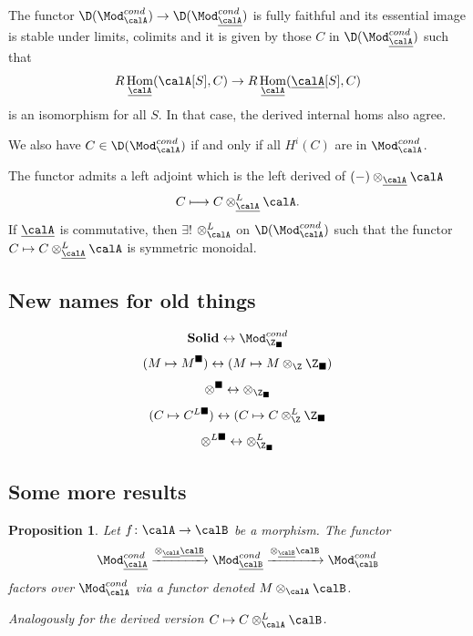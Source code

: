 \documentclass[A4paper, british]{amsart}
\theoremstyle{darkgreentheorem}
\newtheorem{prop}[thm]{Proposition}
\theoremstyle{darkbluedefinition}
\theoremstyle{darkredexample}
\theoremstyle{remark}
\DeclareMathOperator{\Hom}{Hom}
\newcommand{\Solid}{\mathbf{Solid}}
\newcommand{\1}{\mathbbm{1}}
\renewcommand{\u}[1]{\underline{#1}}
\newcommand{\ot}{\otimes}
\newcommand{\solid}{^{\blacksquare}}
\newcommand{\dsolid}{^{L\blacksquare}}
\newcommand{\usolid}{_{\blacksquare}}
\begin{document}
The functor $\D(\Mod_{\calA}^{cond})\to \D(\Mod_{\u{\calA}}^{cond})$ is fully faithful and its essential image is stable under limits, colimits and it is given by those $C$ in $\D(\Mod_{\u{\calA}}^{cond})$ such that
\[ R\Hom_{\u{\calA}}(\calA[S],C)\to R\Hom_{\u{\calA}}(\u{\calA}[S],C) \]
is an isomorphism for all $S$.
In that case, the derived internal homs also agree.

We also have $C\in \D(\Mod_{\calA}^{cond})$ if and only if all $H^{i}(C)$ are in $\Mod_{\calA}^{cond}$.

The functor admits a left adjoint which is the left derived of $(-)\ot_{\u{\calA}}\calA$
\[ C\longmapsto C\ot_{\u{\calA}}^{L}\calA. \]
If $\u{\calA}$ is commutative, then $\exists !$ $\ot_{\calA}^{L}$ on $\D(\Mod_{\calA}^{cond})$ such that the functor $C\mapsto C\ot_{\u{\calA}}^{L}\calA$ is symmetric monoidal.

\subsection{New names for old things}

\[ \Solid \leftrightarrow \Mod_{\Z\usolid}^{cond} \]
\[ (M\mapsto M\solid) \leftrightarrow (M\mapsto M\ot_{\Z}\Z\usolid) \]
\[ \ot\solid \leftrightarrow \ot_{\Z\usolid} \]
\[ (C\mapsto C\dsolid) \leftrightarrow (C\mapsto C\ot_{\Z}^{L}\Z\usolid \]
\[ \ot\dsolid \leftrightarrow \ot_{\Z\usolid}^{L} \]

\subsection{Some more results}

\begin{prop}
    Let $f\colon \calA\to \calB$ be a morphism.
    The functor
    \[ \Mod_{\u{\calA}}^{cond}\xrightarrow{\ot_{\u{\calA}}\u{\calB}} \Mod_{\u{\calB}}^{cond}\xrightarrow{\ot_{\u{\calB}}\calB} \Mod_{\calB}^{cond} \]
    factors over $\Mod_{\calA}^{cond}$ via a functor denoted $M\ot_{\calA}\calB$.

    Analogously for the derived version $C\mapsto C\ot_{\calA}^{L}\calB$.
\end{prop}
\end{document}
